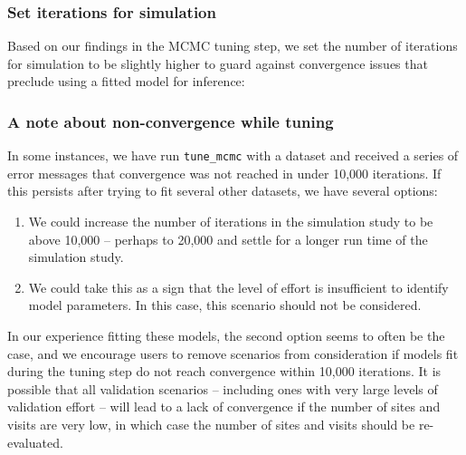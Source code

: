 \documentclass[
]{article}
\newenvironment{Shaded}{\begin{snugshade}}{\end{snugshade}}
\newcommand{\CommentTok}[1]{\textcolor[rgb]{0.56,0.35,0.01}{\textit{#1}}}
\newcommand{\DecValTok}[1]{\textcolor[rgb]{0.00,0.00,0.81}{#1}}
\newcommand{\NormalTok}[1]{#1}
\newcommand{\OtherTok}[1]{\textcolor[rgb]{0.56,0.35,0.01}{#1}}
\newcommand{\SpecialCharTok}[1]{\textcolor[rgb]{0.81,0.36,0.00}{\textbf{#1}}}
\begin{document}
\subsubsection{Set iterations for simulation}\label{set-iterations-for-simulation}

Based on our findings in the MCMC tuning step, we set the number of iterations for simulation to be slightly higher to guard against convergence issues that preclude using a fitted model for inference:

\linespread{1}

\begin{Shaded}
\end{Shaded}

\linespread{1}

\subsubsection{A note about non-convergence while tuning}\label{a-note-about-non-convergence-while-tuning}

In some instances, we have run \texttt{tune\_mcmc} with a dataset and received a series of error messages that convergence was not reached in under 10,000 iterations. If this persists after trying to fit several other datasets, we have several options:

\begin{enumerate}
\def\labelenumi{\arabic{enumi}.}
\item
  We could increase the number of iterations in the simulation study to be above 10,000 -- perhaps to 20,000 and settle for a longer run time of the simulation study.
\item
  We could take this as a sign that the level of effort is insufficient to identify model parameters. In this case, this scenario should not be considered.
\end{enumerate}

In our experience fitting these models, the second option seems to often be the case, and we encourage users to remove scenarios from consideration if models fit during the tuning step do not reach convergence within 10,000 iterations. It is possible that all validation scenarios -- including ones with very large levels of validation effort -- will lead to a lack of convergence if the number of sites and visits are very low, in which case the number of sites and visits should be re-evaluated.
\end{document}
